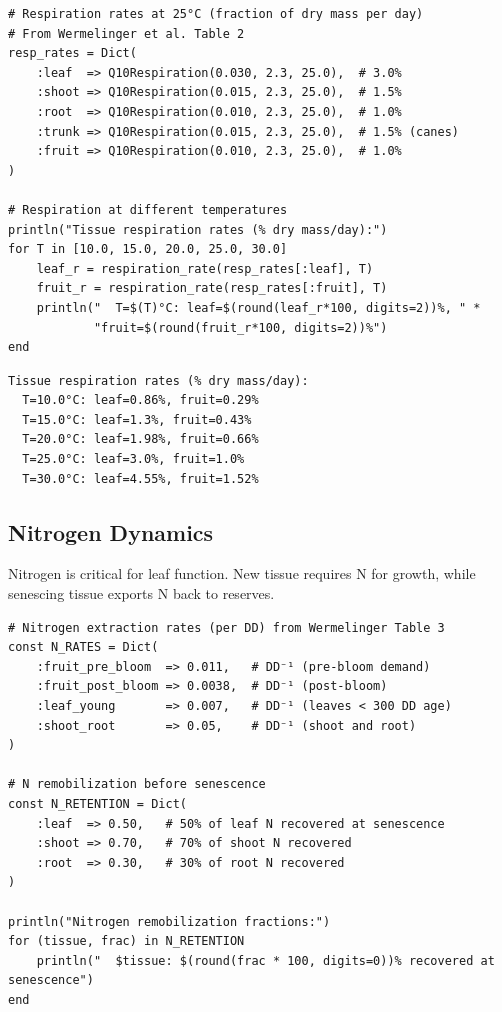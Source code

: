 \begin{verbatim}
# Respiration rates at 25°C (fraction of dry mass per day)
# From Wermelinger et al. Table 2
resp_rates = Dict(
    :leaf  => Q10Respiration(0.030, 2.3, 25.0),  # 3.0%
    :shoot => Q10Respiration(0.015, 2.3, 25.0),  # 1.5%
    :root  => Q10Respiration(0.010, 2.3, 25.0),  # 1.0%
    :trunk => Q10Respiration(0.015, 2.3, 25.0),  # 1.5% (canes)
    :fruit => Q10Respiration(0.010, 2.3, 25.0),  # 1.0%
)

# Respiration at different temperatures
println("Tissue respiration rates (% dry mass/day):")
for T in [10.0, 15.0, 20.0, 25.0, 30.0]
    leaf_r = respiration_rate(resp_rates[:leaf], T)
    fruit_r = respiration_rate(resp_rates[:fruit], T)
    println("  T=$(T)°C: leaf=$(round(leaf_r*100, digits=2))%, " *
            "fruit=$(round(fruit_r*100, digits=2))%")
end
\end{verbatim}




\begin{verbatim}
Tissue respiration rates (% dry mass/day):
  T=10.0°C: leaf=0.86%, fruit=0.29%
  T=15.0°C: leaf=1.3%, fruit=0.43%
  T=20.0°C: leaf=1.98%, fruit=0.66%
  T=25.0°C: leaf=3.0%, fruit=1.0%
  T=30.0°C: leaf=4.55%, fruit=1.52%
\end{verbatim}



\subsection{Nitrogen Dynamics}



\label{9695443709088909487}{}


Nitrogen is critical for leaf function. New tissue requires N for growth, while senescing tissue exports N back to reserves.




\begin{verbatim}
# Nitrogen extraction rates (per DD) from Wermelinger Table 3
const N_RATES = Dict(
    :fruit_pre_bloom  => 0.011,   # DD⁻¹ (pre-bloom demand)
    :fruit_post_bloom => 0.0038,  # DD⁻¹ (post-bloom)
    :leaf_young       => 0.007,   # DD⁻¹ (leaves < 300 DD age)
    :shoot_root       => 0.05,    # DD⁻¹ (shoot and root)
)

# N remobilization before senescence
const N_RETENTION = Dict(
    :leaf  => 0.50,   # 50% of leaf N recovered at senescence
    :shoot => 0.70,   # 70% of shoot N recovered
    :root  => 0.30,   # 30% of root N recovered
)

println("Nitrogen remobilization fractions:")
for (tissue, frac) in N_RETENTION
    println("  $tissue: $(round(frac * 100, digits=0))% recovered at senescence")
end
\end{verbatim}




